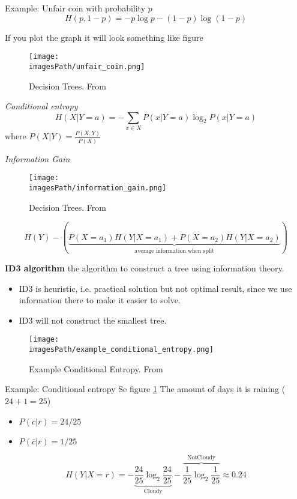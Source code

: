 \begin{exampleblock}{Example: Unfair coin with probability $p$}
   \begin{equation*}
       H(p, 1-p) = -p\log p -(1-p)\log(1-p)
   \end{equation*} 

   If you plot the graph it will look something like figure 
\end{exampleblock}
\begin{figure}[!h]
    \centering
    \texttt{[image: \\imagesPath/unfair\_coin.png]}
    \caption{Decision Trees. From \cite{}}
\end{figure}

\textit{Conditional entropy}
\begin{equation*}
    H(X|Y=a) = -\sum_{x\in X}P(x|Y=a)\log_2 P(x|Y=a)
\end{equation*}
where $P(X|Y) = \frac{P(X,Y)}{P(X)}$

\textit{Information Gain}
\begin{figure}[!h]
    \centering
    \texttt{[image: \\imagesPath/information\_gain.png]}
    \caption{Decision Trees. From \cite{}}
\end{figure}

\begin{equation*}
    H(Y) - \left( \underbrace{P(X=a_1)H(Y|X=a_1) + P(X=a_2)H(Y|X=a_2)}_{\text{average information when split}} \right)
\end{equation*}

\textbf{ID3 algorithm} the algorithm to construct a tree using information
theory.
\begin{itemize}
    \item ID3 is heuristic, i.e. practical solution but not optimal result, since we use information there to make it easier to solve.
    \item ID3 will not construct the smallest tree.
\end{itemize}

\begin{figure}[!h]
    \centering
    \texttt{[image: \\imagesPath/example\_conditional\_entropy.png]}
    \caption{Example Conditional Entropy. From \cite{}}
    \label{fig:example_conditional_entropy}
\end{figure}
\begin{exampleblock}{Example: Conditional entropy}
    Se figure \ref{fig:example_conditional_entropy}
    The amount of days it is raining ($24+1=25$)
    \begin{itemize}
        \item $P(c|r) = 24/25$
        \item $P(\bar{c}|r) = 1/25$ 
    \end{itemize}
    
    \begin{equation*}
        H(Y|X=r) = -\underbrace{\frac{24}{25}\log_2\frac{24}{25}}_{\text{Cloudy}} - \overbrace{\frac{1}{25}\log_2\frac{1}{25}}^{\text{NotCloudy}} \approx 0.24
    \end{equation*}
\end{exampleblock}

